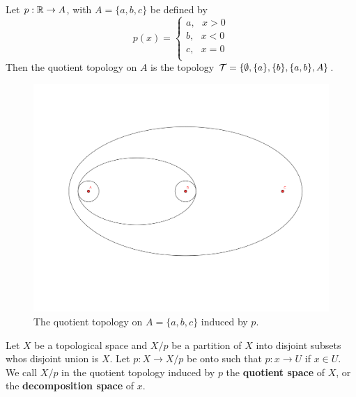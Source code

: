 \begin{example}
    Let $p:\mathbb{R} \rightarrow A$, with  $A=\{a,b,c\}$ be defined by
        \begin{equation*}
            p(x)=\begin{cases}
                    a, \text{ } x>0 \\
                    b, \text{ } x<0 \\
                    c, \text{ } x=0 \\
                \end{cases}
        \end{equation*}
    Then the quotient topology on $A$ is the topology  $\mathcal{T}=\{\emptyset, \{a\}, \{b\}, \{a,b\},A\}$.
    
    \begin{figure} 
        \centering
        \includegraphics[scale = 0.2]{Figures/Chapter2/quotientOnAbc.png}
        \caption{The quotient topology on $A=\{a,b,c\}$ induced by $p$.}
    \end{figure}
\end{example} 

\begin{definition}
    Let $X$ be a topological space and  $X/p$ be a partition of  $X$ into disjoint subsets whos
    disjoint union is  $X$. Let  $p:X \rightarrow X/p$ be onto such that  $p:x \rightarrow U$ if  $x
    \in U$. We call  $X/p$ in the quotient topology induced by $p$ the \textbf{quotient space} of $X$, or the 
    \textbf{decomposition space} of $x$.
\end{definition}

